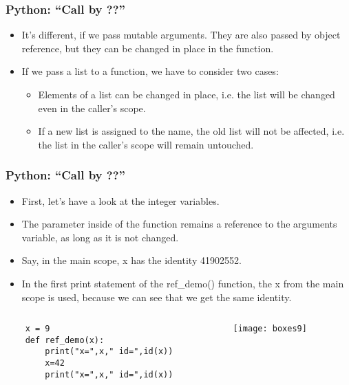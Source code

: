 \begin{frame}[fragile]\frametitle{Python: ``Call by ??'' }
    \begin{itemize}
    \item It's different, if we pass mutable arguments. They are also passed by object reference, but they can be changed in place in the function. 
    \item If we pass a list to a function, we have to consider two cases:
        \begin{itemize}
    \item Elements of a list can be changed in place, i.e. the list will be changed even in the caller's scope.
    \item If a new list is assigned to the name, the old list will not be affected, i.e. the list in the caller's scope will remain untouched. 
                \end{itemize}
            \end{itemize}
\end{frame}

\begin{frame}[fragile]\frametitle{Python: ``Call by ??'' }
    \begin{itemize}
    \item First, let's have a look at the integer variables.
    \item The parameter inside of the function remains a reference to the arguments variable, as long as it is not changed. 
        \item Say, in the main scope, x has the identity 41902552. 
\item In the first print statement of the ref\_demo() function, the x from the main scope is used, because we can see that we get the same identity. 
            \end{itemize}
  \begin{columns}[c]
    \begin{column}{0.5\linewidth}

                \begin{lstlisting}
    x = 9
    def ref_demo(x):
        print("x=",x," id=",id(x))
        x=42
        print("x=",x," id=",id(x))
        \end{lstlisting}

      \end{column}
    \begin{column}{0.4\linewidth}
    \begin{center}
\texttt{[image: boxes9]}
\end{center}
        \end{column}
  \end{columns}
  
   \end{frame}
   
